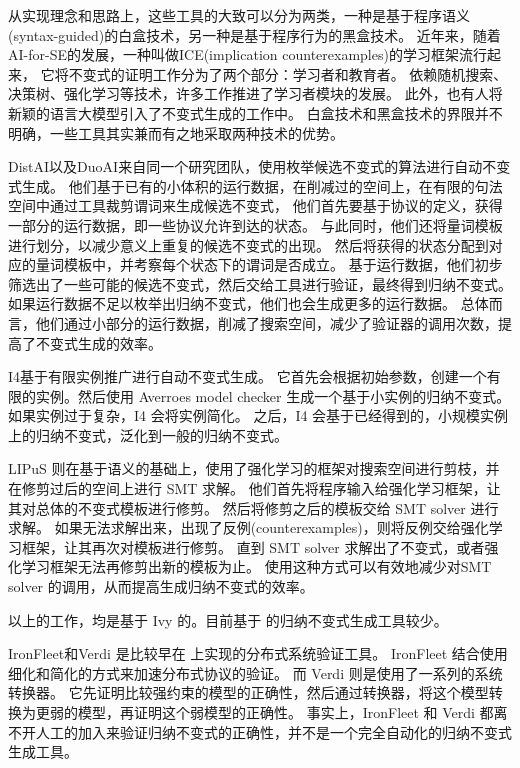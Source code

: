 从实现理念和思路上，这些工具的大致可以分为两类，一种是基于程序语义(syntax-guided)的白盒技术，另一种是基于程序行为的黑盒技术。
近年来，随着 AI-for-SE的发展，一种叫做ICE\cite{ICE}(implication counterexamples)的学习框架流行起来，
它将不变式的证明工作分为了两个部分：学习者和教育者。
依赖随机搜索、决策树\cite{garg2016learning}、强化学习\cite{LIPuS}等技术，许多工作推进了学习者模块的发展。
此外，也有人将新颖的语言大模型引入了不变式生成的工作中\cite{llm}。
白盒技术和黑盒技术的界限并不明确，一些工具其实兼而有之地采取两种技术的优势。

DistAI\cite{DistAI}以及DuoAI\cite{DuoAI}来自同一个研究团队，使用枚举候选不变式的算法进行自动不变式生成。
他们基于已有的小体积的运行数据，在削减过的空间上，在有限的句法空间中通过工具裁剪谓词来生成候选不变式，
他们首先要基于协议的定义，获得一部分的运行数据，即一些协议允许到达的状态。
与此同时，他们还将量词模板进行划分，以减少意义上重复的候选不变式的出现。
然后将获得的状态分配到对应的量词模板中，并考察每个状态下的谓词是否成立。
基于运行数据，他们初步筛选出了一些可能的候选不变式，然后交给工具进行验证，最终得到归纳不变式。
如果运行数据不足以枚举出归纳不变式，他们也会生成更多的运行数据。
总体而言，他们通过小部分的运行数据，削减了搜索空间，减少了验证器的调用次数，提高了不变式生成的效率。

I4\cite{I4}基于有限实例推广进行自动不变式生成。
它首先会根据初始参数，创建一个有限的实例。然后使用 Averroes model checker \cite{goel2019model}生成一个基于小实例的归纳不变式。
如果实例过于复杂，I4 会将实例简化。
之后，I4 会基于已经得到的，小规模实例上的归纳不变式，泛化到一般的归纳不变式。

LIPuS 则在基于语义的基础上，使用了强化学习的框架对搜索空间进行剪枝，并在修剪过后的空间上进行 SMT 求解。
他们首先将程序输入给强化学习框架，让其对总体的不变式模板进行修剪。
然后将修剪之后的模板交给 SMT solver 进行求解。
如果无法求解出来，出现了反例(counterexamples)，则将反例交给强化学习框架，让其再次对模板进行修剪。
直到 SMT solver 求解出了不变式，或者强化学习框架无法再修剪出新的模板为止。
使用这种方式可以有效地减少对SMT solver 的调用，从而提高生成归纳不变式的效率。

以上的工作，均是基于 Ivy 的。目前基于 \TLA 的归纳不变式生成工具较少。

IronFleet\cite{IronFleet}和Verdi\cite{Verdi} 是比较早在 \TLA 上实现的分布式系统验证工具。
IronFleet 结合使用细化和简化的方式来加速分布式协议的验证。
而 Verdi 则是使用了一系列的系统转换器。
它先证明比较强约束的模型的正确性，然后通过转换器，将这个模型转换为更弱的模型，再证明这个弱模型的正确性。
事实上，IronFleet 和 Verdi 都离不开人工的加入来验证归纳不变式的正确性，并不是一个完全自动化的归纳不变式生成工具。

